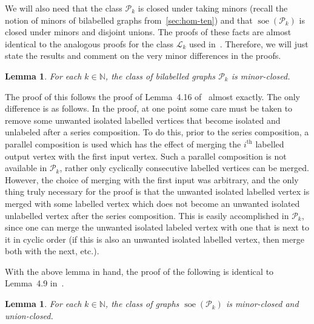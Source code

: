 \documentclass[11pt,a4paper]{article}
\theoremstyle{plain}
\newtheorem{lem}[thm]{Lemma}
\theoremstyle{remark}
\theoremstyle{definition}
\DeclareMathOperator{\soe}{soe}
\def\calP{{\mathcal P}} \def\calQ{{\mathcal Q}} \def\calR{{\mathcal R}}
\begin{document}
We will also need that the class $\calP_k$ is closed under taking minors (recall the notion of minors of bilabelled graphs from~\cref{sec:hom-ten}) and that $\soe(\calP_k)$ is closed under minors and disjoint unions. The proofs of these facts are almost identical to the analogous proofs for the class $\mathcal{L}_k$ used in~\cite{roberson-seppelt-arxiv}. Therefore, we will just state the results and comment on the very minor differences in the proofs.









\begin{lem}\label{lem:minor-closedbl}
    For each $k \in \mathbb{N}$, the class of bilabelled graphs $\calP_k$ is minor-closed. 
\end{lem}
The proof of this follows the proof of Lemma~4.16 of~\cite{roberson-seppelt-arxiv} almost exactly. The only difference is as follows. In the proof, at one point some care must be taken to remove some unwanted isolated labelled vertices that become isolated and unlabeled after a series composition. To do this, prior to the series composition, a parallel composition is used which has the effect of merging the $i^\text{th}$ labelled output vertex with the first input vertex. Such a parallel composition is not available in $\calP_k$, rather only cyclically consecutive labelled vertices can be merged. However, the choice of merging with the first input was arbitrary, and the only thing truly necessary for the proof is that the unwanted isolated labelled vertex is merged with some labelled vertex which does not become an unwanted isolated unlabelled vertex after the series composition. This is easily accomplished in $\calP_k$, since one can merge the unwanted isolated labeled vertex with one that is next to it in cyclic order (if this is also an unwanted isolated labelled vertex, then merge both with the next, etc.).

With the above lemma in hand, the proof of the following is identical to Lemma~4.9 in~\cite{roberson-seppelt-arxiv}.

\begin{lem}\label{lem:minor-closed}
    For each $k \in \mathbb{N}$, the class of graphs $\soe(\calP_k)$ is minor-closed and union-closed. 
\end{lem}
\end{document}
